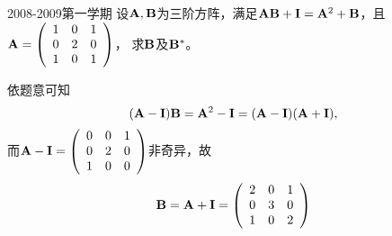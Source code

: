 \begin{frame}
\begin{footnotesize}
\begin{exampleblock}{2008-2009第一学期}
设$\mathbf{A},\mathbf{B}$为三阶方阵，满足$\mathbf{A}\mathbf{B}+\mathbf{I}=\mathbf{A}^2+\mathbf{B}$，且$\mathbf{A}=\left(
\begin{array}{rrr}
1&0&1\\
0&2&0\\
1&0&1
\end{array}
\right)$， 求$\mathbf{B}$及$\mathbf{B}^*$。
\end{exampleblock}
\pause\jiename
依题意可知
$$
(\mathbf{A}-\mathbf{I})\mathbf{B}=\mathbf{A}^2-\mathbf{I}=(\mathbf{A}-\mathbf{I})(\mathbf{A}+\mathbf{I}),
$$
而$\mathbf{A}-\mathbf{I}=\left(
\begin{array}{rrr}
0&0&1\\
0&2&0\\
1&0&0
\end{array}
\right)$非奇异，故$$\mathbf{B}=\mathbf{A}+\mathbf{I}=\left(
\begin{array}{rrr}
2&0&1\\
0&3&0\\
1&0&2
\end{array}
\right)$$
\end{footnotesize}
\end{frame}






